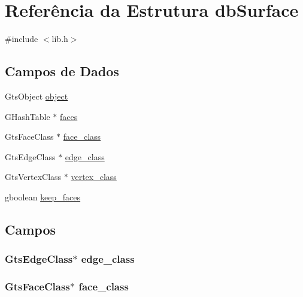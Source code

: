 \hypertarget{structdbSurface}{}\section{Referência da Estrutura db\+Surface}
\label{structdbSurface}


{\ttfamily \#include $<$lib.\+h$>$}

\subsection*{Campos de Dados}
\begin{DoxyCompactItemize}
\item 
Gts\+Object \hyperlink{structdbSurface_a4c9ad028a3c5d740f1fc0b15669c1c0f}{object}
\item 
G\+Hash\+Table $\ast$ \hyperlink{structdbSurface_a2491590bd6d18542d6fab3090c43f646}{faces}
\item 
Gts\+Face\+Class $\ast$ \hyperlink{structdbSurface_a9bdc080583f3916fa54dff0733e84c22}{face\+\_\+class}
\item 
Gts\+Edge\+Class $\ast$ \hyperlink{structdbSurface_aac3a854484328efcd046bed6b836ca03}{edge\+\_\+class}
\item 
Gts\+Vertex\+Class $\ast$ \hyperlink{structdbSurface_a40aba9c5621bf74c8d649089e1a82529}{vertex\+\_\+class}
\item 
gboolean \hyperlink{structdbSurface_a91e9416b378907785e1867c96a71e302}{keep\+\_\+faces}
\end{DoxyCompactItemize}


\subsection{Campos}
\subsubsection[{\texorpdfstring{edge\+\_\+class}{edge_class}}]{\setlength{\rightskip}{0pt plus 5cm}Gts\+Edge\+Class$\ast$ edge\+\_\+class}\hypertarget{structdbSurface_aac3a854484328efcd046bed6b836ca03}{}\label{structdbSurface_aac3a854484328efcd046bed6b836ca03}
\subsubsection[{\texorpdfstring{face\+\_\+class}{face_class}}]{\setlength{\rightskip}{0pt plus 5cm}Gts\+Face\+Class$\ast$ face\+\_\+class}\hypertarget{structdbSurface_a9bdc080583f3916fa54dff0733e84c22}{}\label{structdbSurface_a9bdc080583f3916fa54dff0733e84c22}
